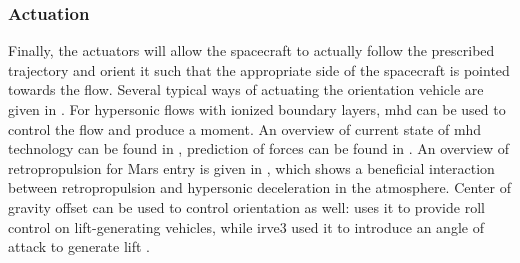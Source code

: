 \subsubsection{Actuation}
Finally, the actuators will allow the spacecraft to actually follow the prescribed trajectory and orient it such that the appropriate side of the spacecraft is pointed towards the flow. Several typical ways of actuating the orientation vehicle are given in \cite{Wertz2011a}. For hypersonic flows with ionized boundary layers, \gls{mhd} can be used to control the flow and produce a moment. An overview of current state of \gls{mhd} technology can be found in \cite{Braun2009}, prediction of forces can be found in \cite{Kawamura2013}. An overview of retropropulsion for Mars entry is given in \cite{Korzun2009}, which shows a beneficial interaction between retropropulsion and hypersonic deceleration in the atmosphere. Center of gravity offset can be used to control orientation as well: \cite{Petsopoulos1996} uses it to provide roll control on lift-generating vehicles, while \gls{irve3} used it to introduce an angle of attack to generate lift \cite{Dillman2013}.